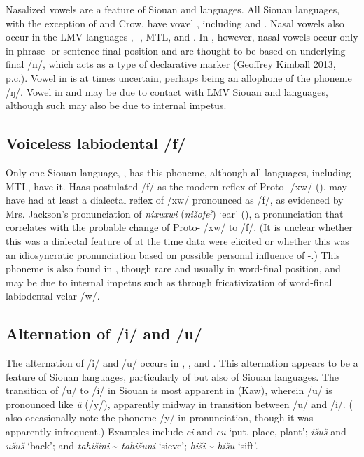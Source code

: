 \documentclass[output=paper]{LSP/langsci}
\begin{document}
Nasalized vowels are a feature of Siouan and  languages. All Siouan languages, with the exception of  and Crow, have vowel , including  and . Nasal vowels also occur in the LMV languages , -, MTL, and . In , however, nasal vowels occur only in phrase- or sentence-final position and are thought to be based on underlying final /n/, which acts as a type of declarative marker (Geoffrey Kimball 2013, p.c.). Vowel  in  is at times uncertain, perhaps being an allophone of the phoneme /ŋ/. Vowel  in  and  may be due to contact with LMV Siouan and  languages, although such  may also be due to internal impetus.

\subsection{Voiceless labiodental  /f/}

Only one Siouan language, , has this phoneme, although all  languages, including MTL, have it. Haas postulated  /f/ as the modern reflex of Proto- /xw/ (\citeyear[36]{Haas1969}).  may have had at least a dialectal reflex of /xw/ pronounced as /f/, as evidenced by Mrs. Jackson’s pronunciation of \emph{nixuxwi} (\emph{nišofeˀ}) `ear' (\citealt[79]{HaasSwadesh1968}), a pronunciation that correlates with the probable change of Proto- /xw/ to /f/. (It is unclear whether this was a dialectal feature of  at the time data were elicited or whether this was an idiosyncratic pronunciation based on possible personal influence of -.) This phoneme is also found in , though rare and usually in word-final position, and may be due to internal impetus such as through fricativization of word-final labiodental velar /w/.

\subsection{Alternation of /i/ and /u/}
	
The alternation of /i/ and /u/ occurs in , , and . This alternation appears to be a feature of Siouan languages, particularly of  but also of  Siouan languages. The transition of /u/ to /i/ in Siouan is most apparent in  (Kaw), wherein /u/ is pronounced like  \emph{ü} (/y/), apparently midway in transition between /u/ and /i/. (\citealt{DorseySwanton1912} also occasionally note the phoneme /y/ in  pronunciation, though it was apparently infrequent.) Examples include  \emph{ci} and \emph{cu} `put, place, plant';  \emph{išuš} and \emph{ušuš} `back'; and  \emph{tahišini} \textasciitilde{} \emph{tahišuni} `sieve';  \emph{hiši} \textasciitilde{} \emph{hišu} `sift'.
\end{document}
